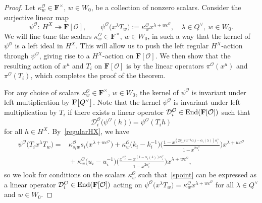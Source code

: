 \documentclass[11pt]{article}
\numberwithin{equation}{section}
\numberwithin{equation}{section}
\begin{document}
\begin{proof}
Let $\kappa_w^\mathcal{O}\in\mathbf{F}^\times$, $w\in W_0$, be a collection of nonzero scalars.
Consider the surjective linear map
\begin{equation}\label{psicmap}
\psi^\mathcal{O}\colon\ H^X\twoheadrightarrow \mathbf{F}[\mathcal{O}],\qquad \psi^\mathcal{O}\bigl(x^\lambda T_w\bigr):=\kappa_w^\mathcal{O}x^{\lambda+wc^{\mathcal{O}}},\quad \lambda\in Q^\vee,\ w\in W_0.
\end{equation}
We will fine tune the scalars $\kappa_w^\mathcal{O}\in\mathbf{F}^\times$, $w\in W_0$, in such a way that the kernel of $\psi^\mathcal{O}$
is a left ideal in $H^X$. This will allow us to push the left regular $H^X$-action through $\psi^\mathcal{O}$, giving rise to a
$H^X$-action on $\mathbf{F}[\mathcal{O}]$. We then show that the resulting action of $x^\mu$ and $T_i$ on $\mathbf{F}[\mathcal{O}]$ is by the linear operators $\pi^\mathcal{O}(x^\mu)$ and $\pi^\mathcal{O}(T_i)$, which completes the proof of the theorem.

For any choice of scalars $\kappa_w^\mathcal{O}\in\mathbf{F}^\times$, $w\in W_0$, the kernel of $\psi^\mathcal{O}$ is invariant under left multiplication by $\mathbf{F}\smash{\bigl[Q^\vee\bigr]}$.
Note that the kernel $\psi^\mathcal{O}$ is invariant under left multiplication by $T_i$ if there exists a linear operator $\mathcal{D}_i^\mathcal{O}\in\textup{End}(\mathbf{F}[\mathcal{O}])$ such that
\begin{equation*}%
\mathcal{D}_i^\mathcal{O}\bigl(\psi^\mathcal{O}(h)\bigr)=\psi^\mathcal{O}(T_ih)
\end{equation*}
for all $h\in H^X$.
By~\eqref{regularHX}, we have
\begin{align}
\psi^\mathcal{O}\bigl(T_ix^\lambda T_w\bigr)={}&\kappa_{s_iw}^\mathcal{O}s_i\bigl(x^{\lambda+wc^{\mathcal{O}}}\bigr)
+ \kappa_w^\mathcal{O}\bigl(k_i-k_i^{-1}\bigr)\Biggl(\frac{1-x^{(2\chi_-\bigl(w^{-1}\alpha_i\bigr)-\alpha_i(\lambda))\alpha_i^\vee}}{1-x^{2\alpha_i^\vee}}\Biggr)x^{\lambda+wc^{\mathcal{O}}}\nonumber\\
&{}+
\kappa_w^\mathcal{O}\bigl(u_i-u_i^{-1}\bigr)\Biggl(\frac{x^{\alpha_i^\vee}-x^{(1-\alpha_i(\lambda))\alpha_i^\vee}}{1-x^{2\alpha_i^\vee}}\Biggr)x^{\lambda+wc^{\mathcal{O}}},
\label{spoint}
\end{align}
so we look for conditions on the scalars $\kappa_w^\mathcal{O}$ such that~\eqref{spoint} can be expressed as
a linear operator $\mathcal{D}_i^\mathcal{O}\in\textup{End}(\mathbf{F}[\mathcal{O}])$ acting on $\psi^\mathcal{O}\bigl(x^\lambda T_w\bigr)=\kappa_w^\mathcal{O}x^{\lambda+wc^\mathcal{O}}$ for all $\lambda\in Q^\vee$ and $w\in W_0$.


\end{proof}
\end{document}
